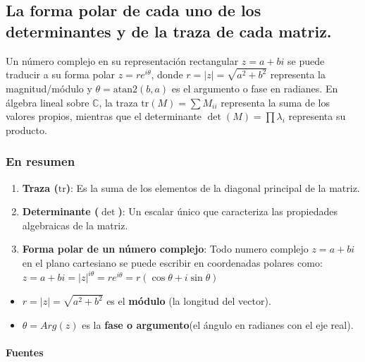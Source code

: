 \documentclass[11pt]{article}
\providecommand{\tightlist}{%
      \setlength{\itemsep}{0pt}\setlength{\parskip}{0pt}}
\begin{document}
    
    \subsection{La forma polar de cada uno de los determinantes y de la
traza de cada
matriz.}\label{la-forma-polar-de-cada-uno-de-los-determinantes-y-de-la-traza-de-cada-matriz.}

Un número complejo en su representación rectangular \(z = a + bi\) se
puede traducir a su forma polar \(z = r e^{i\theta}\), donde
\(r = \vert{z}\vert = \sqrt{a^2 + b^2}\) representa la magnitud/módulo y
\(\theta = \text{atan2}(b, a)\) es el argumento o fase en radianes. En
álgebra lineal sobre \(\mathbb{C}\), la traza
\(\text{tr}(M) = \sum M_{ii}\) representa la suma de los valores
propios, mientras que el determinante \(\det(M) = \prod \lambda_i\)
representa su producto.

\subsubsection{En resumen}\label{en-resumen}

\begin{enumerate}
\def\labelenumi{\arabic{enumi}.}
\tightlist
\item
  \textbf{Traza (\(\text{tr}\))}: Es la suma de los elementos de la
  diagonal principal de la matriz.
\item
  \textbf{Determinante (\(\det\))}: Un escalar único que caracteriza las
  propiedades algebraicas de la matriz.
\item
  \textbf{Forma polar de un número complejo}: Todo numero complejo
  \(z = a + bi\) en el plano cartesiano se puede escribir en coordenadas
  polares como:
  \(z = a + bi = \vert{z}\vert^{i\theta} = r e ^{i \theta } = r (\cos \theta + i \sin \theta)\)
\end{enumerate}

\begin{itemize}
\tightlist
\item
  \(r = \vert{z}\vert = \sqrt{a^2 + b^2}\) es el \textbf{módulo} (la
  longitud del vector).
\item
  \(\theta = Arg(z)\) es la \textbf{fase o argumento}(el ángulo en
  radianes con el eje real).
\end{itemize}

\paragraph{Fuentes}\label{fuentes}
\end{document}
